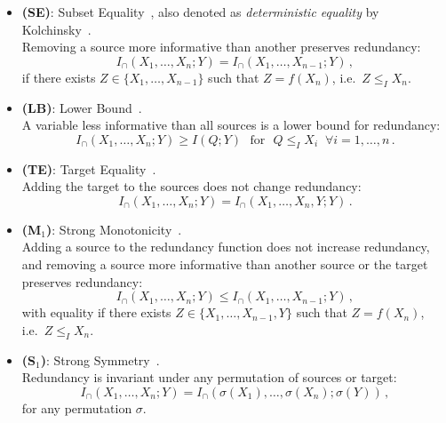 \documentclass{article}
\newcommand{\ts}[1]{\ensuremath{_{\text{#1}}}}
\newcommand{\Xs}{X_1,\ldots,X_n}
\newcommand{\Xsm}{X_1,\ldots,X_{n-1}}
\newcommand{\Icaps}{\ensuremath{I_\cap(\Xs;Y)}}
\newcommand{\Icapsm}{\ensuremath{I_\cap(X_1,\ldots,X_{n-1};Y)}}
\begin{document}
\begin{itemize}
    \item \textbf{(SE)}: Subset Equality~\cite{ince2017measuring}, also denoted as \textit{deterministic equality} by Kolchinsky~\cite{kolchinsky2022novel}. \\
    Removing a source more informative than another preserves redundancy: 
    \begin{equation} \label{ax:SE}
        \Icaps =  \Icapsm \,,
    \end{equation}
    if there exists $Z\in\{\Xsm\}$ such that $Z=f(X_n)$, i.e.\ $Z\leq_I X_n$.

    \item \textbf{(LB)}: Lower Bound~\cite{griffith2014intersection}. \\
    A variable less informative than all sources is a lower bound for redundancy:
    \begin{equation}\label{ax:LB}
        \Icaps \ge I(Q;Y) \,\,\text{ for }\,\, Q\leq_I X_i \;\;\forall i=1,\ldots,n \,.
    \end{equation}

    \item \textbf{(TE)}: Target Equality~\cite{griffith2014intersection, kolchinsky2022novel}. \\
    Adding the target to the sources does not change redundancy:
    \begin{equation}\label{ax:TE}
        \Icaps = I_\cap(\Xs,Y;Y) \,.
    \end{equation}

    \item \textbf{(M\ts{1})}: Strong Monotonicity~\cite{griffith2014intersection}. \\
    Adding a source to the redundancy function does not increase redundancy, and removing a source more informative than another source or the target preserves redundancy:
    \begin{equation}\label{ax:M1}
        \Icaps \leq \Icapsm \,,
    \end{equation}
    with equality if there exists $Z\in\{\Xsm,Y\}$ such that $Z=f(X_n)$, i.e.\ $Z\leq_I X_n$.

    \item \textbf{(S\ts{1})}: Strong Symmetry~\cite{bertschinger2013shared}. \\
    Redundancy is invariant under any permutation of sources or target:
    \begin{equation}\label{ax:S1}
        \Icaps = I_\cap(\sigma(X_1),\ldots,\sigma(X_n);\sigma(Y))\,,
    \end{equation}
    for any permutation $\sigma$.


\end{itemize}
\end{document}
